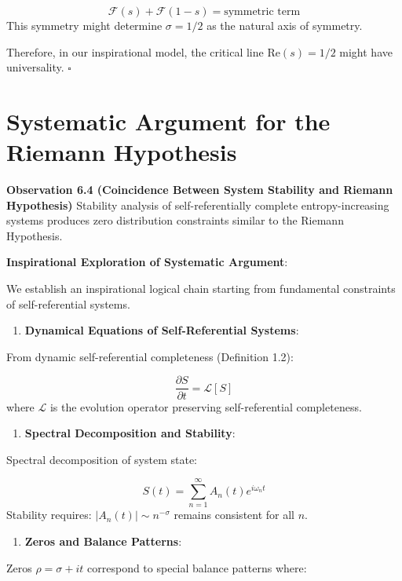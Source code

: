 \begin{equation}
\mathcal{F}(s) + \mathcal{F}(1-s) = \text{symmetric term}
\end{equation}
   This symmetry might determine $\sigma = 1/2$ as the natural axis of symmetry.

Therefore, in our inspirational model, the critical line $\text{Re}(s) = 1/2$ might have universality. $\square$

\section{Systematic Argument for the Riemann Hypothesis}
\label{sec:ch06_riemann:systematic-argument-for-the-riemann-hypothesis}

\textbf{Observation 6.4 (Coincidence Between System Stability and Riemann Hypothesis)}
\label{thm:4.7}
Stability analysis of self-referentially complete entropy-increasing systems produces zero distribution constraints similar to the Riemann Hypothesis.

\textbf{Inspirational Exploration of Systematic Argument}:

We establish an inspirational logical chain starting from fundamental constraints of self-referential systems.

\begin{enumerate}
\item \textbf{Dynamical Equations of Self-Referential Systems}:
\end{enumerate}
   From dynamic self-referential completeness (Definition 1.2):
   
\begin{equation}
\frac{\partial S}{\partial t} = \mathcal{L}[S]
\end{equation}
   where $\mathcal{L}$ is the evolution operator preserving self-referential completeness.
   
\begin{enumerate}
\item \textbf{Spectral Decomposition and Stability}:
\end{enumerate}
   Spectral decomposition of system state:
   
\begin{equation}
S(t) = \sum_{n=1}^{\infty} A_n(t) e^{i\omega_n t}
\end{equation}
   Stability requires: $|A_n(t)| \sim n^{-\sigma}$ remains consistent for all $n$.
   
\begin{enumerate}
\item \textbf{Zeros and Balance Patterns}:
\end{enumerate}
   Zeros $\rho = \sigma + it$ correspond to special balance patterns where:
   

